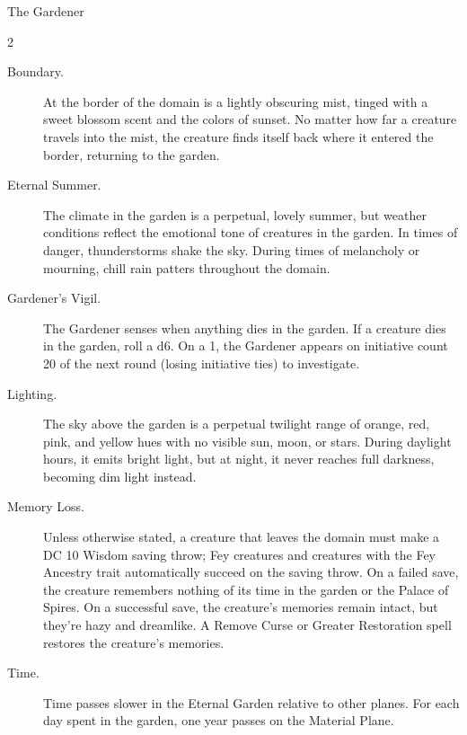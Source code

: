 \documentclass[10pt,a4paper,twoside,bg=print,twocolumn,openany,nodeprecatedcode]{dndbook}
\begin{document}
\begin{DndMonster}[float*=b,width=\textwidth + 8pt]{The Gardener}
\begin{multicols}{2}
\begin{description}
\item[Boundary.]
At the border of the domain is a lightly obscuring mist, tinged with a sweet blossom scent and the colors of sunset. No matter how far a creature travels into the mist, the creature finds itself back where it entered the border, returning to the garden.
\item[Eternal Summer.]
The climate in the garden is a perpetual, lovely summer, but weather conditions reflect the emotional tone of creatures in the garden. In times of danger, thunderstorms shake the sky. During times of melancholy or mourning, chill rain patters throughout the domain.
\item[Gardener's Vigil.]
The Gardener senses when anything dies in the garden. If a creature dies in the garden, roll a d6. On a 1, the Gardener appears on initiative count 20 of the next round (losing initiative ties) to investigate.
\item[Lighting.]
The sky above the garden is a perpetual twilight range of orange, red, pink, and yellow hues with no visible sun, moon, or stars. During daylight hours, it emits bright light, but at night, it never reaches full darkness, becoming dim light instead.
\item[Memory Loss.]
Unless otherwise stated, a creature that leaves the domain must make a DC 10 Wisdom saving throw; Fey creatures and creatures with the Fey Ancestry trait automatically succeed on the saving throw. On a failed save, the creature remembers nothing of its time in the garden or the Palace of Spires. On a successful save, the creature's memories remain intact, but they're hazy and dreamlike. A Remove Curse or Greater Restoration spell restores the creature's memories.
\item[Time.]
Time passes slower in the Eternal Garden relative to other planes. For each day spent in the garden, one year passes on the Material Plane.
\end{description}

\end{multicols}
\end{DndMonster}
\end{document}
